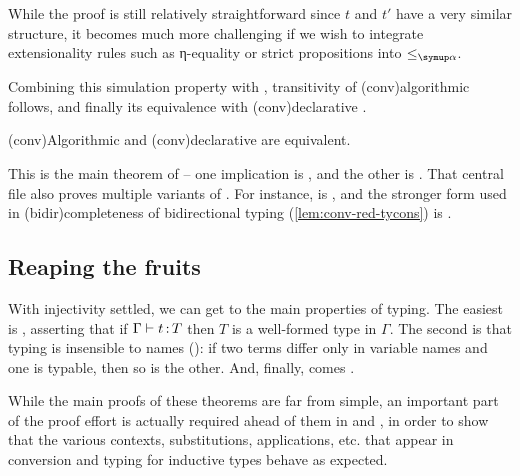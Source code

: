While the proof
is still relatively straightforward since $t$ and $t'$ have a very similar structure, it becomes
much more challenging if we wish to integrate extensionality rules such as η-equality or 
strict propositions%
into $\alphleq$.

Combining this simulation property with ,
transitivity of \kl(conv){algorithmic}  follows,
and finally its equivalence with \kl(conv){declarative} .

\begin{theorem}
  \kl(conv){Algorithmic} and \kl(conv){declarative}  are equivalent.
\end{theorem}

This is the main theorem of  – 
one implication is ,
and the other is .
That central file also proves multiple variants of
.
For instance,  is ,
and the stronger form used in \kl(bidir){completeness} of bidirectional typing
(\cref{lem:conv-red-tycons}) is .

\subsection{Reaping the fruits}

With injectivity settled, we can get to the main properties of typing.
The easiest is ,
asserting that if $\Gamma \vdash t \operatorname{\mathrel{:}} T$ then $T$ is a well-formed type in $\Gamma$.
The second is that typing is insensible to names ():
if two terms differ only in variable names and one is typable, then so is the other.
And, finally, comes .

While the main proofs of these theorems are far from simple,%
an important part of the proof effort is actually required ahead of them
in  and ,
in order to show that the various contexts, substitutions, applications, etc.
that appear in conversion and typing for inductive types behave as expected.

